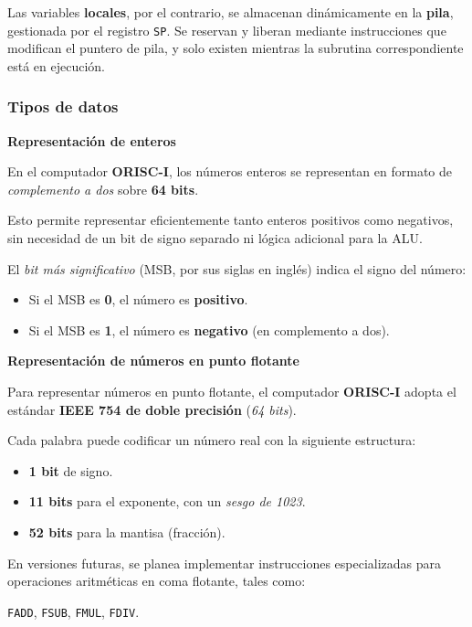 \documentclass{article}
\begin{document}
Las variables \textbf{locales}, por el contrario, se
almacenan dinámicamente en la \textbf{pila}, gestionada por
el registro \texttt{SP}. Se reservan y liberan mediante
instrucciones que modifican el puntero de pila,
y solo existen mientras la subrutina
correspondiente está en ejecución.

\subsubsection{Tipos de datos}

\textbf{Representación de enteros}

En el computador \textbf{ORISC-I}, los números enteros se representan en formato de \textit{complemento a dos} sobre \textbf{64 bits}. 

Esto permite representar eficientemente tanto enteros positivos como negativos, sin necesidad de un bit de signo separado ni lógica adicional para la ALU.

El \textit{bit más significativo} (MSB, por sus siglas en inglés) indica el signo del número:

\begin{itemize}
    \item Si el MSB es \textbf{0}, el número es \textbf{positivo}.
    \item Si el MSB es \textbf{1}, el número es \textbf{negativo} (en complemento a dos).
\end{itemize}

\textbf{Representación de números en punto flotante}

Para representar números en punto flotante, el computador \textbf{ORISC-I} adopta el estándar \textbf{IEEE 754 de doble precisión} (\textit{64 bits}).

Cada palabra puede codificar un número real con la siguiente estructura:

\begin{itemize}
    \item \textbf{1 bit} de signo.
    \item \textbf{11 bits} para el exponente, con un \textit{sesgo de 1023}.
    \item \textbf{52 bits} para la mantisa (fracción).
\end{itemize}

En versiones futuras, se planea implementar instrucciones especializadas para operaciones aritméticas en coma flotante, tales como:

\texttt{FADD}, \texttt{FSUB}, \texttt{FMUL}, \texttt{FDIV}.
\end{document}

